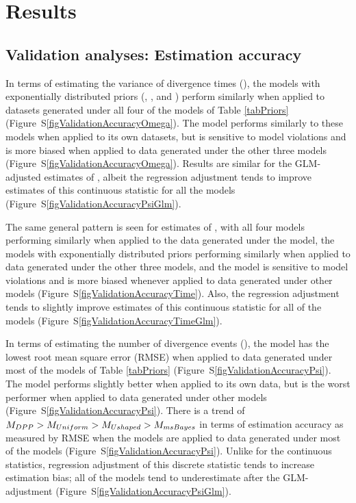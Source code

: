 \section*{Results}
\subsection*{Validation analyses: Estimation accuracy}
In terms of estimating the variance of divergence times (\divTimeDispersion),
the models with exponentially distributed priors (\modelUshaped, \modelUniform,
and \modelDPP) perform similarly when applied to datasets generated under all
four of the models of Table \ref{tabPriors}
(Figure~S\ref{figValidationAccuracyOmega}).
The \modelOld model performs similarly to these models when applied to its
own datasets, but is sensitive to model violations and is more biased when
applied to data generated under the other three models
(Figure~S\ref{figValidationAccuracyOmega}).
Results are similar for the GLM-adjusted estimates of \divTimeDispersion,
albeit the regression adjustment tends to improve estimates of this continuous
statistic for all the models
(Figure~S\ref{figValidationAccuracyPsiGlm}).

The same general pattern is seen for estimates of \divTimeMean, with all four
models performing similarly when applied to the data generated under the
\modelOld model, the models with exponentially distributed priors performing
similarly when applied to data generated under the other three models, and the
\modelOld model is sensitive to model violations and is more biased whenever
applied to data generated under other models
(Figure~S\ref{figValidationAccuracyTime}).
Also, the regression adjustment tends to slightly improve estimates of
this continuous statistic for all of the models
(Figure~S\ref{figValidationAccuracyTimeGlm}).

In terms of estimating the number of divergence events (\divTimeNum), the
\modelDPP model has the lowest root mean square error (RMSE) when applied
to data generated under most of the models of Table \ref{tabPriors}
(Figure~S\ref{figValidationAccuracyPsi}).
The \modelOld model performs slightly better when applied to its own data,
but is the worst performer when applied to data generated under other models
(Figure~S\ref{figValidationAccuracyPsi}).
There is a trend of $M_{DPP} > M_{Uniform} > M_{Ushaped} > M_{msBayes}$
in terms of estimation accuracy as measured by RMSE when the models are applied
to data generated under most of the models
(Figure~S\ref{figValidationAccuracyPsi}).
Unlike for the continuous statistics, regression adjustment of this discrete
statistic tends to increase estimation bias; all of the models tend to
underestimate \divTimeDispersion after the GLM-adjustment
(Figure~S\ref{figValidationAccuracyPsiGlm}).

